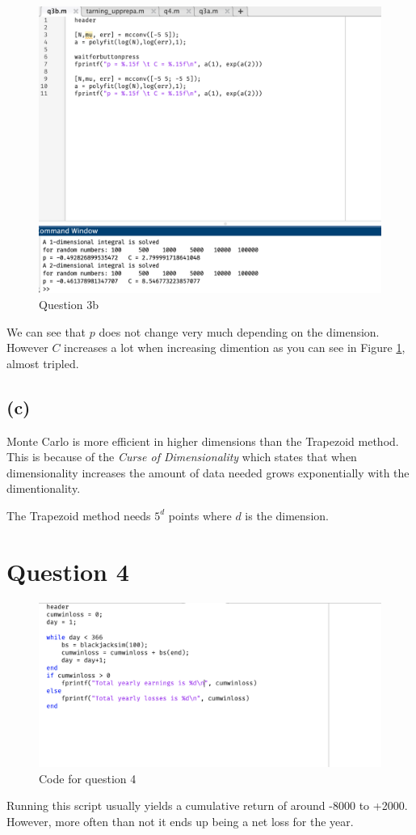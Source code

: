 \documentclass{article}
\begin{document}
\begin{figure}[H]
    \centering
    \includegraphics[width=\linewidth]{imgs/q3b.png}
    \caption{Question 3b}
    \label{q3b}
\end{figure}
We can see that \( p \) does not change very much depending on the dimension.
However \( C \) increases a lot when increasing dimention as you can see in Figure \ref{q3b}, almost tripled.

\subsection{(c)}

Monte Carlo is more efficient in higher dimensions than the Trapezoid method. This is because of the \textit{Curse of Dimensionality}
which states that when dimensionality increases the amount of data needed grows exponentially with the dimentionality.

The Trapezoid method needs \( 5^d \) points where \( d \) is the dimension.
\newpage
\section{Question 4}

\begin{figure}[H]
    \centering
    \includegraphics[width=0.8\linewidth]{imgs/q4_code.png}
    \caption{Code for question 4}
\end{figure}

Running this script usually yields a cumulative return of around -8000 to +2000. However, more often than not
it ends up being a net loss for the year.
\end{document}
